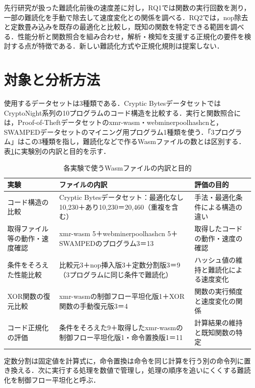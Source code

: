 \documentclass[submit,techrep]{ipsj}
\begin{document}
先行研究が扱った難読化前後の速度差に対し，RQ1では関数の実行回数を測り，一部の難読化を手動で除去して速度変化との関係を調べる．RQ2では，nop除去と定数畳み込みを既存の最適化と比較し，既知の関数を特定できる範囲を調べる．性能分析と関数照合を組み合わせ，解析・検知を支援する正規化の要件を検討する点が特徴である．新しい難読化方式や正規化規則は提案しない．

\section{対象と分析方法}
使用するデータセットは3種類である．Cryptic Bytesデータセット\cite{harnes2024}ではCryptoNight系列の10プログラムのコード構造を比較する．実行と関数照合には，Proof-of-Theftデータセット\cite{sermchaiwong2026}のxmr-wasm・webminerpoolhashcnと，SWAMPEDデータセット\cite{kim2025}のマイニング用プログラム1種類を使う．「3プログラム」はこの3種類を指し，難読化などで作るWasmファイルの数とは区別する．表\ref{tab:datasets}に実験別の内訳と目的を示す．
\begin{table}[t]
\centering\small
\caption{各実験で使うWasmファイルの内訳と目的}
\label{tab:datasets}
\setlength{\tabcolsep}{4pt}
\begin{tabular}{>{\raggedright\arraybackslash}p{}>{\raggedright\arraybackslash}p{}>{\raggedright\arraybackslash}p{}}
\hline
実験 & ファイルの内訳 & 評価の目的 \\
\hline
コード構造の比較 & Cryptic Bytesデータセット：最適化なし10,230＋あり10,230＝20,460（重複を含む） & 手法・最適化条件による構造の違い \\
取得ファイル等の動作・速度確認 & xmr-wasm 5＋webminerpoolhashcn 5＋SWAMPEDのプログラム3＝13 & 取得したコードの動作・速度の確認 \\
条件をそろえた性能比較 & 比較元3＋nop挿入版3＋定数分割版3＝9（3プログラムに同じ条件で難読化） & ハッシュ値の維持と難読化による速度変化 \\
XOR関数の復元比較 & xmr-wasmの制御フロー平坦化版1＋XOR関数の手動復元版3＝4 & 関数の実行頻度と速度変化の関係 \\
コード正規化の評価 & 条件をそろえた9＋取得したxmr-wasmの制御フロー平坦化版1・命令置換版1＝11 & 計算結果の維持と既知関数の特定 \\
\hline
\end{tabular}
\end{table}

定数分割は固定値を計算式に，命令置換は命令を同じ計算を行う別の命令列に置き換える．次に実行する処理を数値で管理し，処理の順序を追いにくくする難読化を制御フロー平坦化と呼ぶ．
\end{document}

